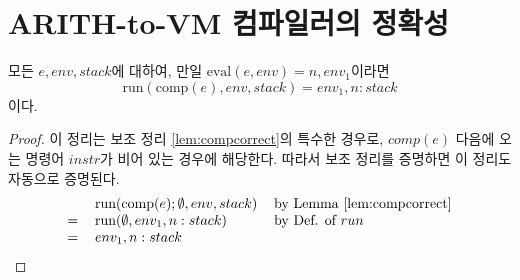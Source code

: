 \documentclass[runningheads]{llncs}
\begin{document}
\section{ARITH-to-VM 컴파일러의 정확성}

\begin{theorem}
\label{thm:compcorrect}
모든 \( e, env, stack \)에 대하여,  
만일 \( \text{eval}(e, env) = n, env_1 \)이라면  
\[
    \text{run}(\text{comp}(e), env, stack) = env_1, n : stack
\]
이다.
\end{theorem}
\begin{proof}
이 정리는 보조 정리 \ref{lem:compcorrect}의 특수한 경우로, $comp(e)$ 다음에 오는 명령어 $instr$가 비어 있는 경우에 해당한다. 
따라서 보조 정리를 증명하면 이 정리도 자동으로 증명된다.
\[
\begin{tabular}{l l l}
       & $\text{run}(\text{comp}(e); \emptyset, env, stack)$  & by Lemma \ref{lem:compcorrect}\\
   $=$ & $\text{run}(\emptyset, env_1, n : stack)$ & by Def. of $run$\\
   $=$ & $ env_1, n : stack$
\end{tabular}
\]
\end{proof}
\end{document}
